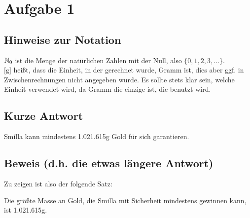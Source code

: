 \fancyhead[L]{\leftmark}

\section{Aufgabe 1}

\subsection*{Hinweise zur Notation}

$\mathbb{N}_0$ ist die Menge der natürlichen Zahlen mit der Null, also $\{ 0, 1, 2, 3, \ldots \}$.\\
$\text{[g]}$ heißt, dass die Einheit, in der gerechnet wurde, Gramm ist, dies aber ggf. in Zwischenrechnungen nicht 
angegeben wurde. Es sollte stets klar sein, welche Einheit verwendet wird, da Gramm die einzige ist, die benutzt wird.\\


\subsection*{Kurze Antwort}

Smilla kann mindestens 1.021.615g Gold für sich garantieren.

\subsection*{Beweis (d.h. die etwas längere Antwort)}

Zu zeigen ist also der folgende Satz:
\begin{thm}
    Die größte Masse an Gold, die Smilla mit Sicherheit mindestens gewinnen kann, ist 1.021.615g.
\end{thm}

